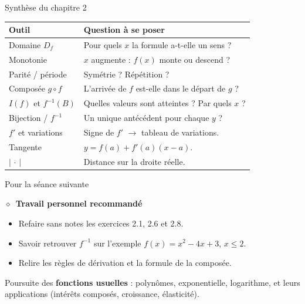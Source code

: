 \documentclass[aspectratio=169,11pt]{beamer}
\providecommand{\faPencilAlt}{$\diamond$}
\newcommand{\key}[1]{\textbf{\color{DarkBlue}#1}}
\begin{document}
\begin{frame}{Synthèse du chapitre 2}
	\begin{center}
		\renewcommand{\arraystretch}{1.25}
		\small
		\begin{tabular}{ll}
			\toprule
			\textbf{Outil} & \textbf{Question à se poser} \\
			\midrule
			Domaine $D_f$ & Pour quels $x$ la formule a-t-elle un sens ? \\
			Monotonie & $x$ augmente : $f(x)$ monte ou descend ? \\
			Parité / période & Symétrie ? Répétition ? \\
			Composée $g\circ f$ & L'arrivée de $f$ est-elle dans le départ de $g$ ? \\
			$I(f)$ et $f^{-1}(B)$ & Quelles valeurs sont atteintes ? Par quels $x$ ? \\
			Bijection / $f^{-1}$ & Un unique antécédent pour chaque $y$ ? \\
			$f'$ et variations & Signe de $f'$ $\to$ tableau de variations. \\
			Tangente & $y=f(a)+f'(a)(x-a)$. \\
			$\lvert\,\cdot\,\rvert$ & Distance sur la droite réelle. \\
			\bottomrule
		\end{tabular}
	\end{center}
\end{frame}

\begin{frame}{Pour la séance suivante}
	\begin{applicationbox}
		\faPencilAlt\ \textbf{Travail personnel recommandé}
		\begin{itemize}
			\item Refaire sans notes les exercices 2.1, 2.6 et 2.8.
			\item Savoir retrouver $f^{-1}$ sur l'exemple $f(x)=x^2-4x+3$, $x\le 2$.
			\item Relire les règles de dérivation et la formule de la composée.
		\end{itemize}
	\end{applicationbox}
	\vspace{0.35cm}
	\begin{exemplebox}
		Poursuite des \key{fonctions usuelles} : polynômes, exponentielle, logarithme,
		et leurs applications (intérêts composés, croissance, élasticité).
	\end{exemplebox}
\end{frame}
\end{document}
